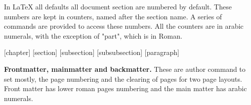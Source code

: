 \begin{teX}
{  \global\let\@maketitle\relax
  \global\let\@thanks\@empty
  \global\let\@author\@empty
  \global\let\@date\@empty
  \global\let\@title\@empty
  \global\let\title\relax
  \global\let\author\relax
  \global\let\date\relax
  \global\let\and\relax
}
\def\@maketitle{%
  \newpage
  \null
  \vskip 2em%
  \begin{center}%
  \let \footnote \thanks
    {\LARGE \@title \par}%
    \vskip 1.5em%
    {\large
      \lineskip .5em%
      \begin{tabular}[t]{c}%
        \@author
      \end{tabular}\par}%
    \vskip 1em%
    {\large \@date}%
  \end{center}%
  \par
  \vskip 1.5em}
\fi
\end{teX}


\quad 
In LaTeX all defaults all document section are numbered by default. These numbers are kept in counters, named after the section name. A series of commands are provided to access these numbers.
All the counters are in arabic numerals, with the exception of "part", which is in Roman.


\begin{teX}
\newcommand*\chaptermark[1]{}
\setcounter{secnumdepth}{2}
[chapter]
[section]
[subsection]
[subsubsection]
[paragraph]
\renewcommand \thepart {\@Roman\c@part}
\renewcommand \thechapter {\@arabic\c@chapter}
\renewcommand \thesection {\thechapter.\@arabic\c@section}
\renewcommand\thesubsection   {\thesection.\@arabic\c@subsection}
\renewcommand\thesubsubsection{\thesubsection.\@arabic\c@subsubsection}
\renewcommand\theparagraph    {\thesubsubsection.\@arabic\c@paragraph}
\renewcommand\thesubparagraph {\theparagraph.\@arabic\c@subparagraph}
\newcommand\@chapapp{\chaptername}
\end{teX}

\begin{multicols}{2}
\textbf{Frontmatter, mainmatter and backmatter.} These are author command to set mostly, the page numbering and the clearing of pages for two page layouts. Front matter has lower roman pages numbering and the main matter has arabic numerals.
\end{multicols}

\begin{teXXX}
\newcommand\frontmatter{%
    \cleardoublepage
  \@mainmatterfalse
  \pagenumbering{roman}}

\newcommand\mainmatter{%
    \cleardoublepage
  \@mainmattertrue
  \pagenumbering{arabic}}

\newcommand\backmatter{%
  \if@openright
    \cleardoublepage
  \else
    \clearpage
  \fi
  \@mainmatterfalse}
\end{teXXX}

